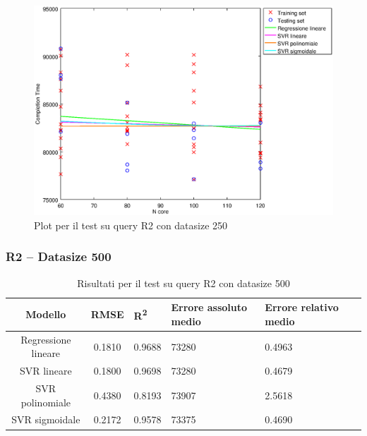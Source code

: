 \documentclass[a4paper,11pt]{article}
\begin{document}
\begin {figure}[hbtp]
\centering
\includegraphics[width=\textwidth]{output/R2_250/plot_R2_250.eps}
\caption {Plot per il test su query R2 con datasize 250}
\end {figure}

\newpage
\subsubsection{R2 -- Datasize 500}
\begin{table}[bhpt]
	\centering
	\begin{adjustbox}{center}
		\begin{tabular}{c | c M{1cm} M{2.5cm} M{2.5cm} M{1.8cm}}
			Modello & RMSE & R\textsuperscript{2} & Errore assoluto medio & Errore relativo medio \tabularnewline
			\hline
			Regressione lineare & 0.1810 & 0.9688 &  73280 & 0.4963 \\
			SVR lineare & 0.1800 & 0.9698 &  73280 & 0.4679 \\
			SVR polinomiale & 0.4380 & 0.8193 &  73907 & 2.5618 \\
			SVR sigmoidale & 0.2172 & 0.9578 &  73375 & 0.4690 \\
		\end{tabular}
	\end{adjustbox}
	\\
	\caption{Risultati per il test su query R2 con datasize 500}
	\label{table_R2_500}
\end{table}
\end{document}
